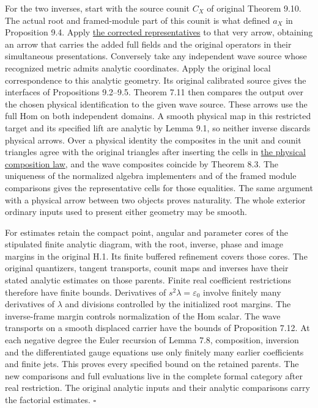 \documentclass[
  english,
  11pt,
  reqno]{amsart}
\begin{document}
For the two inverses, start with the source counit \(C_X\) of original
Theorem 9.10. The actual root and framed-module part of this counit is
what defined \(a_X\) in Proposition 9.4. Apply
\hyperref[eq:analytic-formal-representatives]{the corrected
representatives} to that very arrow, obtaining an arrow that carries the
added full fields and the original operators in their simultaneous
presentations. Conversely take any independent wave source whose
recognized metric admits analytic coordinates. Apply the original local
correspondence to this analytic geometry. Its original calibrated source
gives the interfaces of Propositions 9.2--9.5. Theorem 7.11 then
compares the output over the chosen physical identification to the given
wave source. These arrows use the full Hom on both independent domains.
A smooth physical map in this restricted target and its specified lift
are analytic by Lemma 9.1, so neither inverse discards physical arrows.
Over a physical identity the composites in the unit and counit triangles
agree with the original triangles after inserting the cells in
\hyperref[eq:analytic-physical-cells]{the physical composition law}, and
the wave composites coincide by Theorem 8.3. The uniqueness of the
normalized algebra implementers and of the framed module comparisons
gives the representative cells for those equalities. The same argument
with a physical arrow between two objects proves naturality. The whole
exterior ordinary inputs used to present either geometry may be smooth.

For estimates retain the compact point, angular and parameter cores of
the stipulated finite analytic diagram, with the root, inverse, phase
and image margins in the original H.1. Its finite buffered refinement
covers those cores. The original quantizers, tangent transports, counit
maps and inverses have their stated analytic estimates on those parents.
Finite real coefficient restrictions therefore have finite bounds.
Derivatives of \(s^2\lambda=\varepsilon_0\) involve finitely many
derivatives of \(\lambda\) and divisions controlled by the initialized
root margins. The inverse-frame margin controls normalization of the Hom
scalar. The wave transports on a smooth displaced carrier have the
bounds of Proposition 7.12. At each negative degree the Euler recursion
of Lemma 7.8, composition, inversion and the differentiated gauge
equations use only finitely many earlier coefficients and finite jets.
This proves every specified bound on the retained parents. The new
comparisons and full evaluations live in the complete formal category
after real restriction. The original analytic inputs and their analytic
comparisons carry the factorial estimates. \hfill\(\square\)
\end{document}
